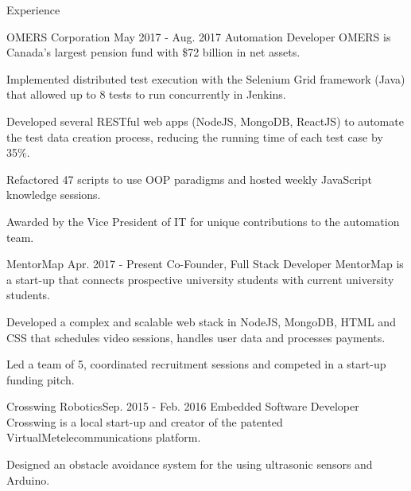 \documentclass{resume} %
\begin{document}
\begin{rSection}{Experience}

\begin{expSec}
{OMERS Corporation}
{May 2017 - Aug. 2017}
{Automation Developer \href{http://www.omers.com/}{\space\small\faExternalLink}}
{OMERS is Canada's largest pension fund with \$72 billion in net assets.}
\item Implemented distributed test execution with the Selenium Grid framework (Java) that allowed up to 8 tests to run concurrently in Jenkins.
\item Developed several RESTful web apps \href{https://github.com/jsun98/OMERS_DataCreation}{\small\faGithub}
(NodeJS, MongoDB, ReactJS) to automate the test data creation process, reducing the running time of each test case by 35\%.
\item Refactored 47 scripts to use OOP paradigms and hosted weekly JavaScript knowledge sessions.
\item Awarded by the Vice President of IT for unique contributions to the automation team. \href{https://twitter.com/QA_AUTOLIVE/status/902266945587748864}{\space\footnotesize\faExternalLink}
\end{expSec}

\begin{expSec}
{MentorMap}
{Apr. 2017 - Present}
{Co-Founder, Full Stack Developer \href{https://www.mentormap.ca/}{\space\small\faExternalLink}}
{MentorMap is a start-up that connects prospective university students with current university students.}
\item Developed a complex and scalable web stack in NodeJS, MongoDB, HTML and CSS that schedules video sessions, handles user data and processes payments.
\item Led a team of 5, coordinated recruitment sessions and competed in a start-up funding pitch.
\end{expSec}

\begin{expSec}{Crosswing Robotics}{Sep. 2015 - Feb. 2016}
{Embedded Software Developer \href{http://www.crosswing.com/}{\space\small\faExternalLink}}
{Crosswing is a local start-up and creator of the patented VirtualMe\texttrademark\space telecommunications platform.}
\item Designed an obstacle avoidance system for the \href{http://www.crosswing.com/virtualme.html}{\color{gray}{VirtualMe\texttrademark\space}} using ultrasonic sensors and Arduino.\href{https://github.com/jsun98/CrossWing-WeedRobot/}{\space\small\faGithub}
\end{expSec}


\end{rSection}
\end{document}
